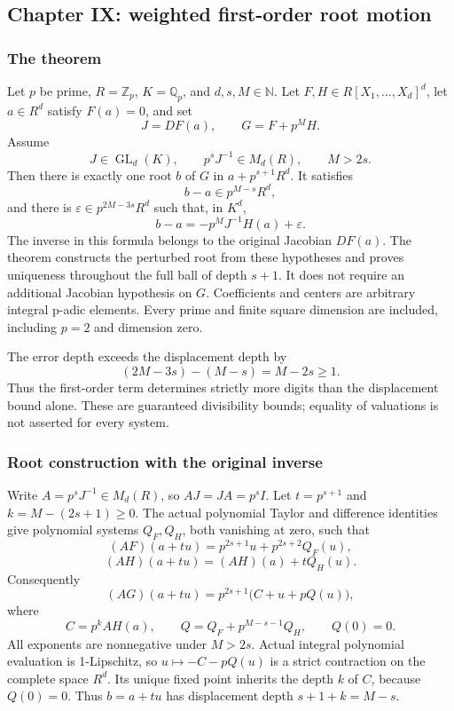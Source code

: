 \hypertarget{cont7:paper-ix-weighted-first-order-root-motion}{%
\subsection{Chapter IX: weighted first-order root
motion}\label{cont7:paper-ix-weighted-first-order-root-motion}}

\hypertarget{cont7:the-theorem}{%
\subsubsection{The theorem}\label{cont7:the-theorem}}

Let \(p\) be prime, \(R=\mathbb Z_p\), \(K=\mathbb Q_p\), and
\(d,s,M\in\mathbb N\). Let \(F,H\in R[X_1,\ldots,X_d]^d\), let
\(a\in R^d\) satisfy \(F(a)=0\), and set \[
J=DF(a),\qquad G=F+p^M H.
\] Assume \[
J\in\operatorname{GL}_d(K),\qquad p^sJ^{-1}\in M_d(R),\qquad M>2s.
\] Then there is exactly one root \(b\) of \(G\) in \(a+p^{s+1}R^d\). It
satisfies \[
b-a\in p^{M-s}R^d,
\] and there is \(\varepsilon\in p^{2M-3s}R^d\) such that, in \(K^d\),
\[
\boxed{b-a=-p^M J^{-1}H(a)+\varepsilon.}
\] The inverse in this formula belongs to the original Jacobian
\(DF(a)\). The theorem constructs the perturbed root from these
hypotheses and proves uniqueness throughout the full ball of depth
\(s+1\). It does not require an additional Jacobian hypothesis on \(G\).
Coefficients and centers are arbitrary integral p-adic elements. Every
prime and finite square dimension are included, including \(p=2\) and
dimension zero.

The error depth exceeds the displacement depth by \[
(2M-3s)-(M-s)=M-2s\ge1.
\] Thus the first-order term determines strictly more digits than the
displacement bound alone. These are guaranteed divisibility bounds;
equality of valuations is not asserted for every system.

\hypertarget{cont7:root-construction-with-the-original-inverse}{%
\subsubsection{Root construction with the original
inverse}\label{cont7:root-construction-with-the-original-inverse}}

Write \(A=p^sJ^{-1}\in M_d(R)\), so \(AJ=JA=p^sI\). Let \(t=p^{s+1}\)
and \(k=M-(2s+1)\ge0\). The actual polynomial Taylor and difference
identities give polynomial systems \(Q_F,Q_H\), both vanishing at zero,
such that \[
(AF)(a+tu)=p^{2s+1}u+p^{2s+2}Q_F(u),
\] \[
(AH)(a+tu)=(AH)(a)+tQ_H(u).
\] Consequently \[
(AG)(a+tu)=p^{2s+1}\bigl(C+u+pQ(u)\bigr),
\] where \[
C=p^kAH(a),\qquad
Q=Q_F+p^{M-s-1}Q_H,\qquad Q(0)=0.
\] All exponents are nonnegative under \(M>2s\). Actual integral
polynomial evaluation is 1-Lipschitz, so \(u\mapsto-C-pQ(u)\) is a
strict contraction on the complete space \(R^d\). Its unique fixed point
inherits the depth \(k\) of \(C\), because \(Q(0)=0\). Thus \(b=a+tu\)
has displacement depth \(s+1+k=M-s\).

